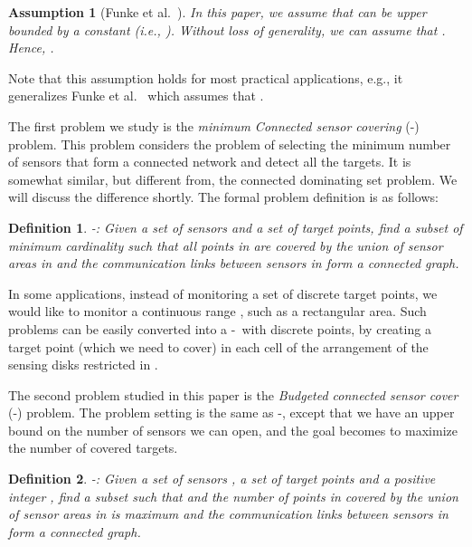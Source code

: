 \documentclass[11pt]{article}
\newtheorem{assumption}{Assumption}
\newcommand{\mincsc}{-}
\newcommand{\bcsc}{-}
\newtheorem{definition}{Definition}
\begin{document}
\begin{assumption}[Funke et al.~\cite{funke2007improved}]
	\label{ass:1}
	In this paper, we assume that  can be upper bounded by a constant 
	(i.e., ). 
Without loss of generality, we can assume that .
	Hence, .
\end{assumption}

Note that this assumption holds for most practical
applications, e.g., it generalizes Funke et al.~\cite{funke2007improved} which assumes that .

The first problem we study is the {\em minimum Connected sensor covering} (\mincsc) problem.
This problem considers the problem of selecting the minimum number of sensors
that form a connected network and detect all the targets.
It is somewhat similar, but different from, the connected dominating set problem.
We will discuss the difference shortly.
The formal problem definition is as follows:

\begin{definition}
	\mincsc: Given a set  of sensors
	and a set  of target points,
	find a subset  of minimum cardinality
	such that all points in  are covered by the union of sensor areas in 
	and the communication links between sensors in  form a connected graph.
\end{definition}
\vspace{-0.1cm}

In some applications, instead of monitoring a set of discrete target points,
we would like to monitor a continuous range , such as a rectangular area.
Such problems can be easily converted into a \mincsc\ with discrete points,
by creating a target point (which we need to cover) in each cell of the arrangement
of the sensing disks  restricted in .


The second problem
studied in this paper is the {\em Budgeted connected sensor cover}  (\bcsc) problem.
The problem setting is the same as \mincsc, except that
we have an upper bound on the number of sensors we can open, and the goal becomes
to maximize the number of covered targets.

\vspace{-0.1cm}
\begin{definition}
	\bcsc: Given a set  of sensors , a set  of target points and a positive integer ,
	find a subset 
	such that  and the number of points in  covered by the union of sensor areas in  is maximum and the communication links between sensors in  form a connected graph.
\end{definition}
\end{document}
